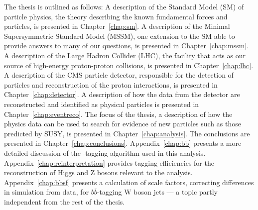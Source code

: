The thesis is outlined as follows: A description of the Standard Model (SM) of particle physics, the theory describing the known fundamental forces and particles, is presented in Chapter~\ref{chap:sm}. A description of the Minimal Supersymmetric Standard Model (MSSM), one extension to the SM able to provide answers to many of our questions, is presented in Chapter~\ref{chap:mssm}. A description of the Large Hadron Collider (LHC), the facility that acts as our source of high-energy proton-proton collisions, is presented in Chapter~\ref{chap:lhc}. A description of the CMS particle detector, responsible for the detection of particles and reconstruction of the proton interactions, is presented in Chapter~\ref{chap:detector}. A description of how the data from the detector are reconstructed and identified as physical particles is presented in Chapter~\ref{chap:eventreco}. The focus of the thesis, a description of how the physics data can be used to search for evidence of new particles such as those predicted by SUSY, is presented in Chapter~\ref{chap:analysis}. The conclusions are presented in Chapter~\ref{chap:conclusions}. Appendix~\ref{chap:bb} presents a more detailed discussion of the \bbbar-tagging algorithm used in this analysis. Appendix~\ref{chap:reinterpretation} provides tagging efficiencies for the reconstruction of Higgs and Z bosons relevant to the analysis. Appendix~\ref{chap:bbsf} presents a calculation of scale factors, correcting differences in simulation from data, for $b\bar{b}$-tagging W boson jets --- a topic partly independent from the rest of the thesis.
